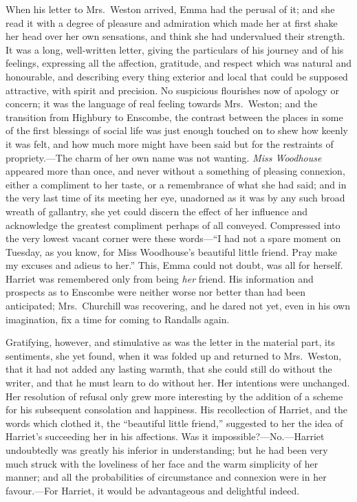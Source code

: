 When his letter to Mrs.\ Weston arrived, Emma had the perusal of it;
and she read it with a degree of pleasure and admiration which made
her at first shake her head over her own sensations, and think she
had undervalued their strength.  It was a long, well-written letter,
giving the particulars of his journey and of his feelings,
expressing all the affection, gratitude, and respect which was
natural and honourable, and describing every thing exterior and local
that could be supposed attractive, with spirit and precision.
No suspicious flourishes now of apology or concern; it was the
language of real feeling towards Mrs.\ Weston; and the transition
from Highbury to Enscombe, the contrast between the places in some
of the first blessings of social life was just enough touched on
to shew how keenly it was felt, and how much more might have been
said but for the restraints of propriety.---The charm of her own
name was not wanting.  \emph{Miss Woodhouse} appeared more than once,
and never without a something of pleasing connexion, either a
compliment to her taste, or a remembrance of what she had said;
and in the very last time of its meeting her eye, unadorned as it
was by any such broad wreath of gallantry, she yet could discern
the effect of her influence and acknowledge the greatest compliment
perhaps of all conveyed.  Compressed into the very lowest vacant
corner were these words---``I had not a spare moment on Tuesday,
as you know, for Miss Woodhouse's beautiful little friend.  Pray make
my excuses and adieus to her.''  This, Emma could not doubt, was all
for herself.  Harriet was remembered only from being \emph{her} friend.
His information and prospects as to Enscombe were neither worse nor
better than had been anticipated; Mrs.\ Churchill was recovering,
and he dared not yet, even in his own imagination, fix a time for
coming to Randalls again.

Gratifying, however, and stimulative as was the letter in the
material part, its sentiments, she yet found, when it was folded up
and returned to Mrs.\ Weston, that it had not added any lasting warmth,
that she could still do without the writer, and that he must learn
to do without her.  Her intentions were unchanged.  Her resolution
of refusal only grew more interesting by the addition of a scheme for
his subsequent consolation and happiness.  His recollection of Harriet,
and the words which clothed it, the ``beautiful little friend,''
suggested to her the idea of Harriet's succeeding her in his affections.
Was it impossible?---No.---Harriet undoubtedly was greatly his
inferior in understanding; but he had been very much struck with
the loveliness of her face and the warm simplicity of her manner;
and all the probabilities of circumstance and connexion were in
her favour.---For Harriet, it would be advantageous and delightful indeed.

